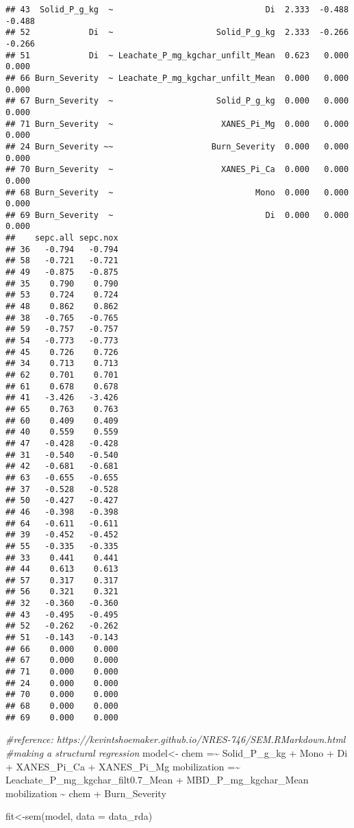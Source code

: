 \documentclass[
]{article}
\newenvironment{Shaded}{\begin{snugshade}}{\end{snugshade}}
\newcommand{\AttributeTok}[1]{\textcolor[rgb]{0.77,0.63,0.00}{#1}}
\newcommand{\CommentTok}[1]{\textcolor[rgb]{0.56,0.35,0.01}{\textit{#1}}}
\newcommand{\FunctionTok}[1]{\textcolor[rgb]{0.00,0.00,0.00}{#1}}
\newcommand{\NormalTok}[1]{#1}
\newcommand{\OtherTok}[1]{\textcolor[rgb]{0.56,0.35,0.01}{#1}}
\newcommand{\StringTok}[1]{\textcolor[rgb]{0.31,0.60,0.02}{#1}}
\begin{document}
\begin{verbatim}
## 43  Solid_P_g_kg  ~                               Di  2.333  -0.488  -0.488
## 52            Di  ~                     Solid_P_g_kg  2.333  -0.266  -0.266
## 51            Di  ~ Leachate_P_mg_kgchar_unfilt_Mean  0.623   0.000   0.000
## 66 Burn_Severity  ~ Leachate_P_mg_kgchar_unfilt_Mean  0.000   0.000   0.000
## 67 Burn_Severity  ~                     Solid_P_g_kg  0.000   0.000   0.000
## 71 Burn_Severity  ~                      XANES_Pi_Mg  0.000   0.000   0.000
## 24 Burn_Severity ~~                    Burn_Severity  0.000   0.000   0.000
## 70 Burn_Severity  ~                      XANES_Pi_Ca  0.000   0.000   0.000
## 68 Burn_Severity  ~                             Mono  0.000   0.000   0.000
## 69 Burn_Severity  ~                               Di  0.000   0.000   0.000
##    sepc.all sepc.nox
## 36   -0.794   -0.794
## 58   -0.721   -0.721
## 49   -0.875   -0.875
## 35    0.790    0.790
## 53    0.724    0.724
## 48    0.862    0.862
## 38   -0.765   -0.765
## 59   -0.757   -0.757
## 54   -0.773   -0.773
## 45    0.726    0.726
## 34    0.713    0.713
## 62    0.701    0.701
## 61    0.678    0.678
## 41   -3.426   -3.426
## 65    0.763    0.763
## 60    0.409    0.409
## 40    0.559    0.559
## 47   -0.428   -0.428
## 31   -0.540   -0.540
## 42   -0.681   -0.681
## 63   -0.655   -0.655
## 37   -0.528   -0.528
## 50   -0.427   -0.427
## 46   -0.398   -0.398
## 64   -0.611   -0.611
## 39   -0.452   -0.452
## 55   -0.335   -0.335
## 33    0.441    0.441
## 44    0.613    0.613
## 57    0.317    0.317
## 56    0.321    0.321
## 32   -0.360   -0.360
## 43   -0.495   -0.495
## 52   -0.262   -0.262
## 51   -0.143   -0.143
## 66    0.000    0.000
## 67    0.000    0.000
## 71    0.000    0.000
## 24    0.000    0.000
## 70    0.000    0.000
## 68    0.000    0.000
## 69    0.000    0.000
\end{verbatim}

\begin{Shaded}
\begin{Highlighting}[]
\CommentTok{\#reference: https://kevintshoemaker.github.io/NRES{-}746/SEM.RMarkdown.html}
\CommentTok{\#making a structural regression}
\NormalTok{model}\OtherTok{\textless{}{-}}\StringTok{\textquotesingle{}}
\StringTok{chem =\textasciitilde{} Solid\_P\_g\_kg + Mono + Di + XANES\_Pi\_Ca + XANES\_Pi\_Mg }
\StringTok{mobilization =\textasciitilde{} Leachate\_P\_mg\_kgchar\_filt0.7\_Mean + MBD\_P\_mg\_kgchar\_Mean}
\StringTok{mobilization \textasciitilde{} chem + Burn\_Severity}
\StringTok{\textquotesingle{}}

\NormalTok{fit}\OtherTok{\textless{}{-}}\FunctionTok{sem}\NormalTok{(model, }\AttributeTok{data =}\NormalTok{ data\_rda)}
\end{Highlighting}
\end{Shaded}
\end{document}
